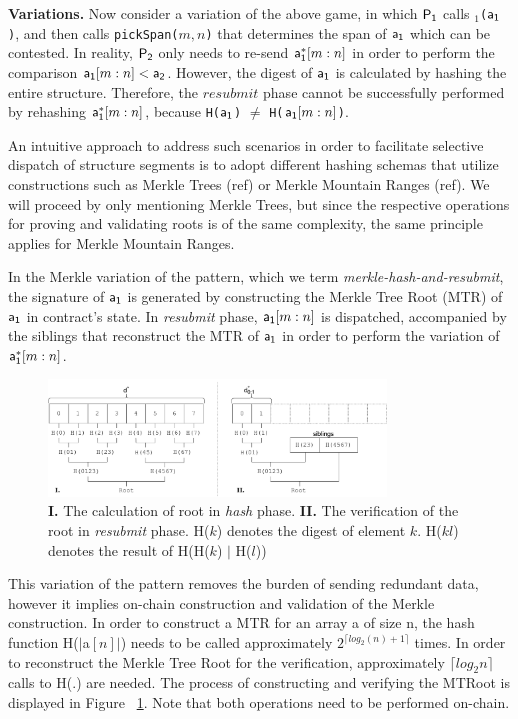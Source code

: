 \noindent \textbf{Variations.} Now consider a variation of the above game, in
which $\mathsf{P_1}$ calls \texttt{\proc$_1$(}$\mathsf{a_1}$\texttt{)}, and then calls
\texttt{pickSpan(}$m, n$\texttt{)} that determines the span of $\mathsf{a_1}$ which
can be contested. In reality, $\mathsf{P_2}$ only needs to re-send $\mathsf{a_1^*}[m:n]$ in
order to perform the comparison $\mathsf{a_1}[m:n] < \mathsf{a_2}$. However, the digest of
$\mathsf{a_1}$ is calculated by hashing the entire structure. Therefore, the
$resubmit$ phase cannot be successfully performed by rehashing $\mathsf{a_1^*}[m:n]$,
because \texttt{H(}$\mathsf{a_1}$\texttt{)} $\ne$ \texttt{H(}$\mathsf{a_1}[m:n]$\texttt{)}.

An intuitive approach to address such scenarios in order to facilitate
selective dispatch of structure segments is to adopt different hashing schemas
that utilize constructions such as Merkle Trees (ref) or Merkle Mountain Ranges
(ref). We will proceed by only mentioning Merkle Trees, but since the
respective operations for proving and validating roots is of the same
complexity, the same principle applies for Merkle Mountain Ranges.

In the Merkle variation of the pattern, which we term
\emph{merkle-hash-and-resubmit}, the signature of $\mathsf{a_1}$ is generated by
constructing the Merkle Tree Root (MTR) of $\mathsf{a_1}$ in contract's state. In
\emph{resubmit} phase, $\mathsf{a_1}[m:n]$ is dispatched, accompanied by the siblings
that reconstruct the MTR of $\mathsf{a_1}$ in order to perform the variation of
$\mathsf{a_1^*}[m:n]$.

\begin{figure}[h]
    \begin{center}
        \includegraphics[width=0.8\textwidth]{figures/merkle-har.pdf}
    \end{center}
    \caption{\textbf{I.} The calculation of root in \emph{hash} phase.
    \textbf{II.} The verification of the root in \emph{resubmit} phase.
    \textsf{H}($k$) denotes the digest of element $k$. \textsf{H}($kl$) denotes the
    result of \textsf{H}(\textsf{H}($k$) $|$ \textsf{H}($l$))
}
    \label{fig:merkle-har}
\end{figure}

This variation of the pattern removes the burden of sending redundant data,
however it implies on-chain construction and validation of the Merkle
construction. In order to construct a MTR for an array \textsf{a} of size
\textsf{n}, the hash function \textsf{H}($|$\textsf{a}$[n]|$) needs to be
called approximately $2^{\lceil log_2(n) + 1 \rceil}$ times. In order to
reconstruct the Merkle Tree Root for the verification, approximately $\lceil
log_2{n} \rceil$ calls to \textsf{H}(.) are needed. The process of constructing
and verifying the MTRoot is displayed in Figure ~\ref{fig:merkle-har}. Note
that both operations need to be performed on-chain.

